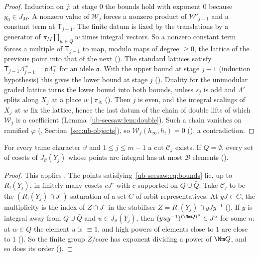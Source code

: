 \begin{proof}
Induction on $j$; at stage $0$ the bounds hold with exponent $0$ because $y_0\in J_M$. A nonzero
value of $\mathcal W_j$ forces a nonzero product of $\mathcal W'_{j-1}$ and a constant term at
$\mathsf T_{j-1}$. The finite datum is fixed by the translations by a generator of $\pi_M\prod_{w\in Q}w$
times integral vectors. So a nonzero constant term forces a multiple of $\mathsf T_{j-1}$ to map, modulo
maps of degree $\ge0$, the lattice of the previous point into that of the next
(). The standard lattices satisfy
$\mathsf T_{j-1}\Lambda_{j-1}^+=\mathfrak a\Lambda_j^-$ for an idele $\mathfrak a$. With the upper bound at
stage $j-1$ (induction hypothesis) this gives the lower bound at stage $j$
(). Duality for the unimodular graded
lattice turns the lower bound into both bounds, unless $s_j$ is odd and $\Lambda'$ splits along
$X_j$ at a place $w\mid\pi_N$ ().
Then $j$ is even, and the integral scalings of $X_j$ at $w$ fix the lattice, hence the last datum
of the chain of double lifts of which $\mathcal W_j$ is a coefficient
(Lemma~\ref{ub-seesaw:lem:double}). Such a chain vanishes on ramified $\varphi$
(, Section~\ref{sec:ub-objects}), so
$\mathcal W_j(h_\infty,h_{\mathrm f})=0$ (), a contradiction.
\end{proof}

\begin{lemma}\label{ub-seesaw:lem:cut}
For every tame character $\vartheta$ and $1\le j\le m-1$ a cut $\mathcal C_j$ exists. If
$Q=\emptyset$, every set of cosets of $J_\vartheta(Y_j)$ whose points are integral has at
most $\mathcal B$ elements ().
\end{lemma}

\begin{proof}
This applies .
The points satisfying~\eqref{ub-seesaw:eq:bounds} lie, up to $R_{\mathrm f}(Y_j)$, in finitely many cosets
$cJ^\circ$ with $c$ supported on $Q\cup\bar Q$. Take $\mathcal C_j$ to be the
$(R_{\mathrm f}(Y_j)\cap J^\circ)$-saturation of a set $C$ of orbit representatives. At $yJ\in C$, the
multiplicity is the index of $Z\cap J^\circ$ in the stabiliser $Z=R_{\mathrm f}(Y_j)\cap yJy^{-1}$
(). If $y$ is integral away from
$Q\cup\bar Q$ and $u\in J_\vartheta(Y_j)$, then $(yuy^{-1})^{(\Nm Q)^n}\in J^\circ$
for some $n$: at $w\in Q$ the element $u$ is $\equiv1$, and high powers of elements close to $1$ are
close to $1$ (). So the finite group $Z/\mathrm{core}$ has
exponent dividing a power of $\Nm Q$, and so does its order
().
\end{proof}

